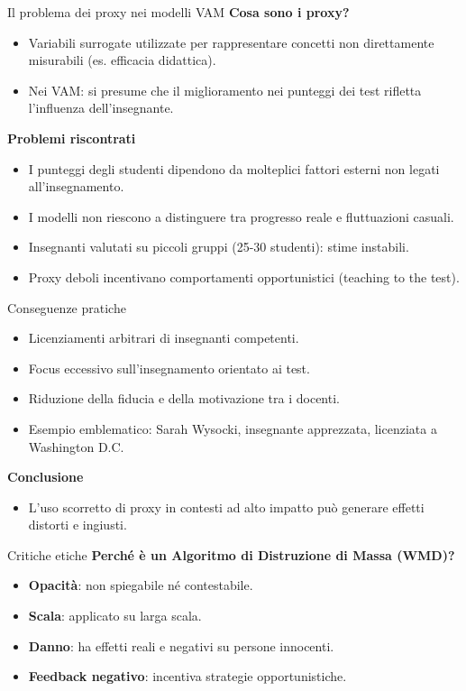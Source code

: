 \documentclass{beamer}
\begin{document}
\begin{frame}{Il problema dei proxy nei modelli VAM}
\textbf{Cosa sono i proxy?}
\begin{itemize}
  \item Variabili surrogate utilizzate per rappresentare concetti non direttamente misurabili (es. efficacia didattica).
  \item Nei VAM: si presume che il miglioramento nei punteggi dei test rifletta l'influenza dell'insegnante.
\end{itemize}

\textbf{Problemi riscontrati}
\begin{itemize}
  \item I punteggi degli studenti dipendono da molteplici fattori esterni non legati all'insegnamento.
  \item I modelli non riescono a distinguere tra progresso reale e fluttuazioni casuali.
  \item Insegnanti valutati su piccoli gruppi (25-30 studenti): stime instabili.
  \item Proxy deboli incentivano comportamenti opportunistici (teaching to the test).
\end{itemize}
\end{frame}
%
%
\begin{frame}{Conseguenze pratiche}
\begin{itemize}
  \item Licenziamenti arbitrari di insegnanti competenti.
  \item Focus eccessivo sull'insegnamento orientato ai test.
  \item Riduzione della fiducia e della motivazione tra i docenti.
  \item Esempio emblematico: Sarah Wysocki, insegnante apprezzata, licenziata a Washington D.C.
\end{itemize}
\vspace{.3cm}
\textbf{Conclusione}
\begin{itemize}
  \item L'uso scorretto di proxy in contesti ad alto impatto pu\`o generare effetti distorti e ingiusti.
\end{itemize}
\end{frame}
%
%
\begin{frame}{Critiche etiche}
\textbf{Perch\'e \`e un Algoritmo di Distruzione di Massa (WMD)?}
\begin{itemize}
  \item \textbf{Opacit\`a}: non spiegabile n\'e contestabile.
  \item \textbf{Scala}: applicato su larga scala.
  \item \textbf{Danno}: ha effetti reali e negativi su persone innocenti.
  \item \textbf{Feedback negativo}: incentiva strategie opportunistiche.
\end{itemize}
\end{frame}
\end{document}
